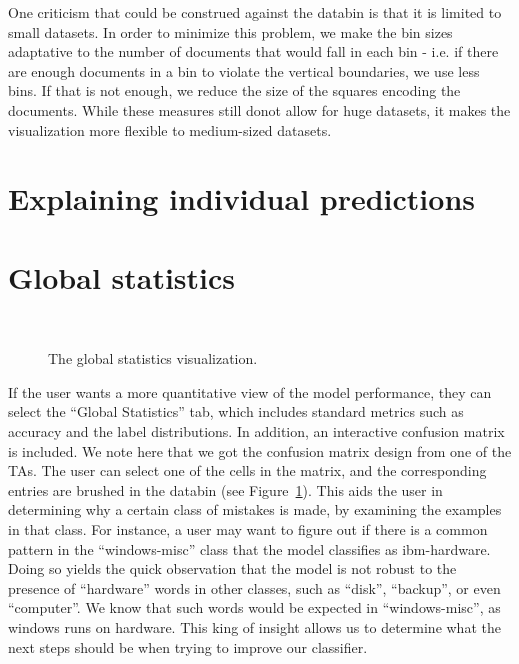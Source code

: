 \documentclass{chi2009}
\begin{document}
One criticism that could be construed against the databin is that it is limited
to small datasets. In order to minimize this problem, we make the bin sizes
adaptative to the number of documents that would fall in each bin - i.e. if
there are enough documents in a bin to violate the vertical boundaries, we use
less bins. If that is not enough, we reduce the size of the squares encoding the
documents. While these measures still donot allow for huge datasets, it makes the
visualization more flexible to medium-sized datasets.

\section{Explaining individual predictions}
\section{Global statistics}
\begin{figure}
  \\
  \caption{The global statistics visualization.}
  \label{fig:statistics}
\end{figure}

If the user wants a more quantitative view of the model performance, they can
select the ``Global Statistics'' tab, which includes standard metrics such as
accuracy and the label distributions. In addition, an interactive confusion
matrix is included. We note here that we got the confusion matrix design from
one of the TAs. The user can select one of the cells in the matrix, and the
corresponding entries are brushed in the databin (see
Figure~\ref{fig:statistics}). This aids the user in determining why a certain
class of mistakes is made, by examining the examples in that class. For
instance, a user may want to figure out if there is a common pattern in the
``windows-misc'' class that the model classifies as ibm-hardware. Doing so
yields the quick observation that the model is not robust to the presence of
``hardware'' words in other classes, such as ``disk'', ``backup'', or even
``computer''. We know that such words would be expected in ``windows-misc'', as
windows runs on hardware. This king of insight allows us to determine what the
next steps should be when trying to improve our classifier.
\end{document}
